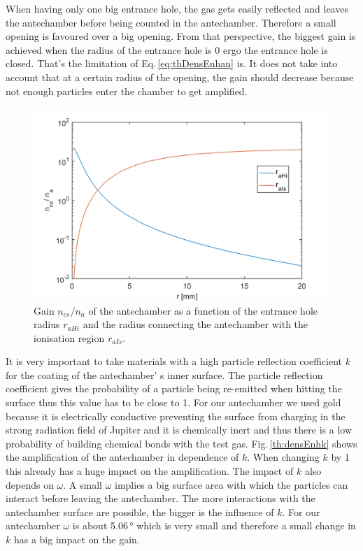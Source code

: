 		When having only one big entrance hole, the gas gets easily reflected and leaves the antechamber before being counted in the antechamber. Therefore a small opening is favoured over a big opening. From that perspective, the biggest gain is achieved when the radius of the entrance hole is 0 ergo the entrance hole is closed. That's the limitation of Eq.\,\eqref{eq:thDensEnhan} is. It does not take into account that at a certain radius of the opening, the gain should decrease because not enough particles enter the chamber to get amplified.\\
		\begin{figure}[h!] %
			\centering
			\includegraphics[width= .7\textwidth]{Bilder/raHi_raIs.png}
			\caption{Gain $n_{cs}/n_a$ of the antechamber as a function of the entrance hole radius $r_{aHi}$ and the radius connecting the antechamber with the ionisation region $r_{aIs}$.}
			\label{th:densEnhraHiraIs}
		\end{figure}
		It is very important to take materials with a high particle reflection coefficient $k$ for the coating of the antechamber' s inner surface. The particle reflection coefficient gives the probability of a particle being re-emitted when hitting the surface thus this value has to be close to 1. For our antechamber we used gold because it is electrically conductive preventing the surface from charging in the strong radiation field of Jupiter and it is chemically inert and thus there is a low probability of building chemical bonds with the test gas. Fig.\,\ref{th:densEnhk} shows the amplification of the antechamber in dependence of $k$. When changing $k$ by 1\textperthousand\, this already has a huge impact on the amplification. The impact of $k$ also depends on $\omega$. A small $\omega$ implies a big surface area with which the particles can interact before leaving the antechamber. The more interactions with the antechamber surface are possible, the bigger is the influence of $k$. For our antechamber $\omega$ is about 5.06\,\si{\degree} which is very small and therefore a small change in $k$ has a big impact on the gain.\\
